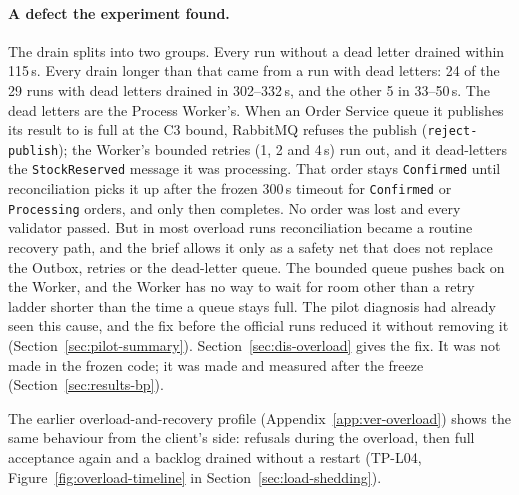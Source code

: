 \documentclass[a4paper]{report}
\begin{document}
\paragraph{A defect the experiment found.} The drain splits into two groups.
Every run without a dead letter drained within 115\,s. Every drain longer
than that came from a run with dead letters: 24 of the 29 runs with dead
letters drained in 302--332\,s, and the other 5 in 33--50\,s. The dead
letters are the Process Worker's. When an Order Service queue it publishes
its result to is full at the C3 bound, RabbitMQ refuses the publish
(\texttt{reject-publish}); the Worker's bounded retries (1, 2 and 4\,s) run
out, and it dead-letters the \texttt{StockReserved} message it was
processing. That order stays \texttt{Confirmed} until reconciliation picks it
up after the frozen 300\,s timeout for \texttt{Confirmed} or
\texttt{Processing} orders, and only then completes. No order was lost and
every validator passed. But in most overload runs reconciliation became a
routine recovery path, and the brief allows it only as a safety net that does
not replace the Outbox, retries or the dead-letter queue. The bounded queue
pushes back on the Worker, and the Worker has no way to wait for room other
than a retry ladder shorter than the time a queue stays full.
The pilot diagnosis had already seen this cause, and the fix before the
official runs reduced it without removing it (Section~\ref{sec:pilot-summary}).
Section~\ref{sec:dis-overload} gives the fix. It was not made in the frozen
code; it was made and measured after the freeze (Section~\ref{sec:results-bp}).

The earlier overload-and-recovery profile (Appendix~\ref{app:ver-overload}) shows the same behaviour from the
client's side: refusals during the overload, then full acceptance again and
a backlog drained without a restart (TP-L04, Figure~\ref{fig:overload-timeline}
in Section~\ref{sec:load-shedding}).

\begin{table}[tbp]
\centering
\scriptsize
\setlength{\tabcolsep}{4pt}
\caption{Recovery after the overload cells (200 and 400/s). Unfinished and
Outbox are the backlog when the load ends: unfinished orders and unpublished
Outbox rows (Order Service plus every Inventory replica). Queues is the peak
of the messages summed over the main queues after the load ends. 99\,\% done
is the seconds from the last submission until unfinished orders first fall to
1\,\% of their count at the end, at the collector's 5\,s resolution. Stable is the
matrix's drain time, whose clock starts when its post step begins, a few
seconds after the last submission. Reconc. counts the runs with dead-lettered
messages and a drain over 200\,s, the runs that most likely waited for
reconciliation; it is inferred from those two measures, not read from the
reconciliation counter. Cells: median of 3 runs (range).}
\label{tab:results-recovery}
\end{table}
\end{document}
